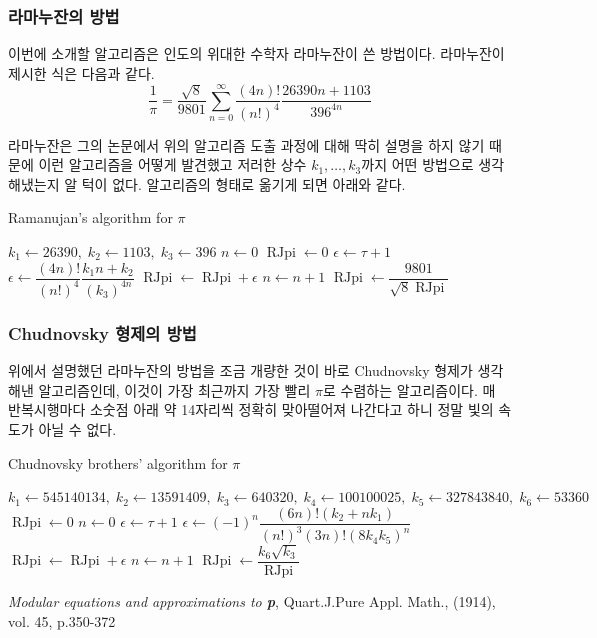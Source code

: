 \documentclass[10pt]{article}
\newcommand{\opn}{\operatorname}
\begin{document}
\subsubsection{라마누잔의 방법}
이번에 소개할 알고리즘은 인도의 위대한 수학자 라마누잔이 쓴 방법이다. 라마누잔이 제시한 식은 다음과 같다.
$$
  \frac{1}{\pi} = \frac{\sqrt{8}}{9801}\sum_{n=0}^{\infty}\frac{\left(4n\right)!}{\left(n!\right)^{4}}\frac{26390n+1103}{396^{4n}}
$$

라마누잔은 그의 논문\cite{ramanujan}에서 위의 알고리즘 도출 과정에 대해 딱히 설명을 하지 않기 때문에 이런 알고리즘을 어떻게 발견했고 저러한 상수 $k_{1},\ldots , k_{3}$까지 어떤 방법으로 생각해냈는지 알 턱이 없다. 알고리즘의 형태로 옮기게 되면 아래와 같다.
\begin{algorithm}
  \caption{Ramanujan's algorithm for $\pi$}
  \begin{algorithmic}[1]
  \label{RJpi}
    \State $k_{1} \gets 26390, \; k_{2} \gets 1103, \; k_{3} \gets 396$
    \State $n \gets 0$
    \State $ \opn{RJpi} \gets 0$
    \State $\epsilon \gets \tau + 1$
    \While{$\epsilon > \tau$}
      \State $\epsilon \gets \dfrac{\left(4n\right)!}{\left(n!\right)^{4}}\dfrac{k_{1}n+k_{2}}{\left(k_{3}\right)^{4n}}$
      \State $\opn{RJpi} \gets \opn{RJpi} + \epsilon$
      \State $n \gets n + 1$
    \EndWhile
    \State $\opn{RJpi} \gets \dfrac{9801}{\sqrt{8}\opn{RJpi}}$
  \EndProcedure
  \end{algorithmic}
\end{algorithm}


\subsubsection{Chudnovsky 형제의 방법}
위에서 설명했던 라마누잔의 방법을 조금 개량한 것이 바로 Chudnovsky 형제가 생각해낸 알고리즘인데, 이것이 가장 최근까지 가장 빨리 $\pi$로 수렴하는 알고리즘이다. 매 반복시행마다 소숫점 아래 약 14자리씩 정확히 맞아떨어져 나간다고 하니 정말 빛의 속도가 아닐 수 없다.
\begin{algorithm}
  \caption{Chudnovsky brothers' algorithm for $\pi$}
  \begin{algorithmic}[1]
  \label{CBpi}
    \State $k_{1} \gets 545140134,\; k_{2} \gets 13591409,\; k_{3} \gets 640320, \; k_{4}\gets 100100025, \; k_{5} \gets 327843840, \; k_{6} \gets 53360 $
    \State $\opn{RJpi} \gets 0$
    \State $n \gets 0$
    \State $\epsilon \gets \tau + 1$
    \While{$\epsilon > \tau$}
      \State $\epsilon \gets \left(-1\right)^{n}\dfrac{\left(6n\right)!\left(k_{2}+nk_{1}\right)}{\left(n!\right)^{3}\left(3n\right)!\left(8k_{4}k_{5}\right)^{n}}$
      \State $\opn{RJpi} \gets \opn{RJpi} + \epsilon$
      \State $n \gets n + 1$
    \EndWhile
    \State $\opn{RJpi} \gets \dfrac{k_{6}\sqrt{k_{3}}}{\opn{RJpi}}$ 
  \EndProcedure
  \end{algorithmic}
\end{algorithm}

\pagebreak
\begin{thebibliography}{9}
\textit{Modular equations and approximations to \textbf{p}}, Quart.J.Pure Appl. Math., (1914), vol. 45, p.350-372
\end{thebibliography}
\end{document}
